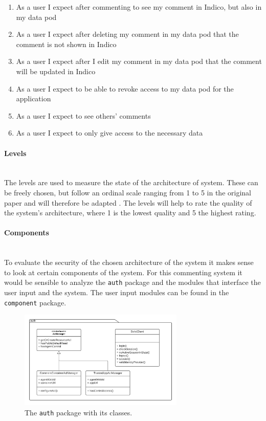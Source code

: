 \begin{enumerate}
    \item As a user I expect after commenting to see my comment in Indico, but also in my data pod
    \item As a user I expect after deleting my comment in my data pod that the comment is not shown in Indico
    \item As a user I expect after I edit my comment in my data pod that the comment will be updated in Indico
    \item As a user I expect to be able to revoke access to my data pod for the application
    \item As a user I expect to see others' comments
    \item As a user I expect to only give access to the necessary data
\end{enumerate}

\paragraph{Levels}\label{poc1-levels}\mbox{}\\

The levels are used to measure the state of the architecture of system. These can be freely chosen, but follow an ordinal scale ranging from 1 to 5 in the original paper and will therefore be adapted \cite{asqa-paper}. The levels will help to rate the quality of the system's architecture, where 1 is the lowest quality and 5 the highest rating.
\vspace{0.5cm}
\paragraph{Components}\mbox{}\\

To evaluate the security of the chosen architecture of the system it makes sense to look at certain components of the system. For this commenting system it would be sensible to analyze the \texttt{auth} package and the modules that interface the user input and the system. The user input modules can be found in the \texttt{component} package.

\begin{figure}[!ht]
    \centering
    \includegraphics[width=0.7\textwidth]{prototype/graphs/poc-comment-package-auth.png}
    \caption{The \texttt{auth} package with its classes.}
    \label{fig:poc-comment-package-auth}
\end{figure}

